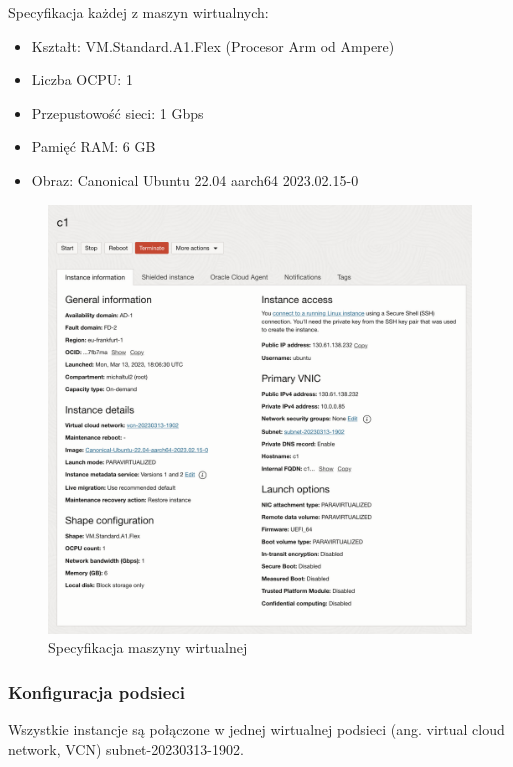 \begin{samepage}
    Specyfikacja każdej z maszyn wirtualnych:
    \begin{itemize}
        \item Kształt: VM.Standard.A1.Flex (Procesor Arm od Ampere)
        \item Liczba OCPU: 1
        \item Przepustowość sieci: 1 Gbps
        \item Pamięć RAM: 6 GB
        \item Obraz: Canonical Ubuntu 22.04 aarch64 2023.02.15-0
    \end{itemize}

    \begin{figure}[H]
        \centering
        \includegraphics[width=\textwidth]{img/oci-instance-details}
        \caption{Specyfikacja maszyny wirtualnej}
        \label{fig:oci-instance-details}
    \end{figure}
\end{samepage}

\subsubsection{Konfiguracja podsieci}

Wszystkie instancje są połączone w jednej wirtualnej podsieci (ang. virtual cloud network, VCN) subnet-20230313-1902.


